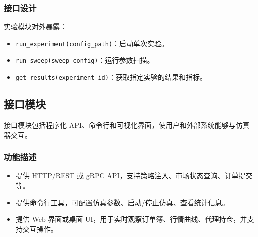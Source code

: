 \subsubsection{接口设计}
实验模块对外暴露：
\begin{itemize}
  \item \verb|run_experiment(config_path)|：启动单次实验。
  \item \verb|run_sweep(sweep_config)|：运行参数扫描。
  \item \verb|get_results(experiment_id)|：获取指定实验的结果和指标。
\end{itemize}

\subsection{接口模块}

接口模块包括程序化 API、命令行和可视化界面，使用户和外部系统能够与仿真器交互。

\subsubsection{功能描述}
\begin{itemize}
  \item 提供 HTTP/REST 或 gRPC API，支持策略注入、市场状态查询、订单提交等。
  \item 提供命令行工具，可配置仿真参数、启动/停止仿真、查看统计信息。
  \item 提供 Web 界面或桌面 UI，用于实时观察订单簿、行情曲线、代理持仓，并支持交互操作。
\end{itemize}

